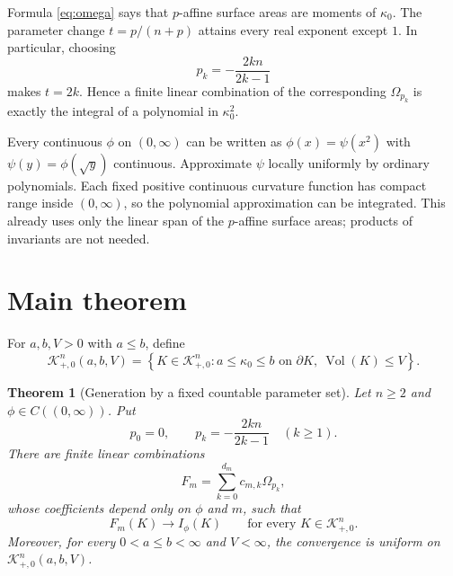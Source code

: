 \documentclass[11pt]{article}
\newtheorem{theorem}{Theorem}
\newcommand{\Kclass}{\mathcal K^n_{+,0}}
\newcommand{\vol}{\operatorname{Vol}}
\begin{document}
Formula \eqref{eq:omega} says that $p$-affine surface areas are moments of
$\kappa_0$. The parameter change $t=p/(n+p)$ attains every real exponent
except $1$. In particular, choosing
\[
 p_k=-\frac{2kn}{2k-1}
\]
makes $t=2k$. Hence a finite linear combination of the corresponding
$\Omega_{p_k}$ is exactly the integral of a polynomial in $\kappa_0^2$.

Every continuous $\phi$ on $(0,\infty)$ can be written as
$\phi(x)=\psi(x^2)$ with $\psi(y)=\phi(\sqrt y)$ continuous. Approximate
$\psi$ locally uniformly by ordinary polynomials. Each fixed positive
continuous curvature function has compact range inside $(0,\infty)$, so the
polynomial approximation can be integrated. This already uses only the
linear span of the $p$-affine surface areas; products of invariants are not
needed.

\section{Main theorem}

For $a,b,V>0$ with $a\leq b$, define
\[
 \Kclass(a,b,V)=\left\{K\in\Kclass:
 a\leq\kappa_0\leq b\text{ on }\partial K,
 \ \vol(K)\leq V\right\}.
\]

\begin{theorem}[Generation by a fixed countable parameter set]
Let $n\geq2$ and $\phi\in C((0,\infty))$. Put
\[
 p_0=0,
 \qquad
 p_k=-\frac{2kn}{2k-1}\quad(k\geq1).
\]
There are finite linear combinations
\[
 F_m=\sum_{k=0}^{d_m}c_{m,k}\Omega_{p_k},
\]
whose coefficients depend only on $\phi$ and $m$, such that
\begin{equation}
 F_m(K)\longrightarrow I_\phi(K)
 \qquad\text{for every }K\in\Kclass.
 \label{eq:pointwise}
\end{equation}
Moreover, for every $0<a\leq b<\infty$ and $V<\infty$, the convergence is
uniform on $\Kclass(a,b,V)$.
\end{theorem}
\end{document}
